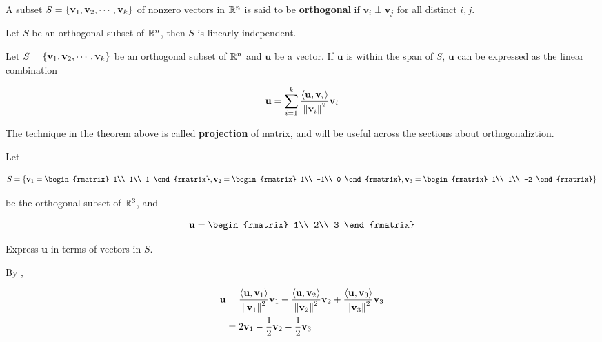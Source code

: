 \documentclass[a4paper,12pt]{article}
\begin{document}
\begin{dft}
  A subset $S=\left\{ \mathbf{v}_{1},\mathbf{v}_{2},\cdots,\mathbf{v}_{k}\right\}$ of nonzero vectors in $\mathbb{R}^{n}$ is said to be \textbf{orthogonal} if $\mathbf{v}_{i}\perp\mathbf{v}_{j}$ for all distinct $i,j$.
\end{dft}\n

\begin{thm}
  Let $S$ be an orthogonal subset of $\mathbb{R}^{n}$, then $S$ is linearly independent.
\end{thm}\n

\begin{thm}
  Let $S=\left\{ \mathbf{v}_{1},\mathbf{v}_{2},\cdots,\mathbf{v}_{k}\right\}$ be an orthogonal subset of $\mathbb{R}^{n}$ and $\mathbf{u}$ be a vector. If $\mathbf{u}$ is within the span of $S$, $\mathbf{u}$ can be expressed as the linear combination

  $$\mathbf{u}=\sum_{i=1}^{k}\frac{\left\langle \mathbf{u},\mathbf{v}_{i}\right\rangle}{\left\| \mathbf{v}_{i}\right\|^{2}}\mathbf{v}_{i}$$
\end{thm}\n

The technique in the theorem above is called \textbf{projection} of matrix, and will be useful across the sections about orthogonaliztion.\n

\begin{exm}
  Let

  $$S=\brc{\mathbf{v}_{1}=\begin{rmatrix}
    1\\
    1\\
    1
  \end{rmatrix},\mathbf{v}_{2}=\begin{rmatrix}
    1\\
    -1\\
    0
  \end{rmatrix},\mathbf{v}_{3}=\begin{rmatrix}
    1\\
    1\\
    -2
  \end{rmatrix}}$$\s

  be the orthogonal subset of $\mathbb{R}^{3}$, and

  $$\mathbf{u}=\begin{rmatrix}
    1\\
    2\\
    3
  \end{rmatrix}$$\s

  Express $\mathbf{u}$ in terms of vectors in $S$.\n

  \ans By \rthm[\sctr{1}],

  $$\begin{aligned}[t]
    \mathbf{u}&=\frac{\left\langle \mathbf{u},\mathbf{v}_{1}\right\rangle}{\left\| \mathbf{v}_{1}\right\|^{2}}\mathbf{v}_{1}+\frac{\left\langle \mathbf{u},\mathbf{v}_{2}\right\rangle}{\left\| \mathbf{v}_{2}\right\|^{2}}\mathbf{v}_{2}+\frac{\left\langle \mathbf{u},\mathbf{v}_{3}\right\rangle}{\left\| \mathbf{v}_{3}\right\|^{2}}\mathbf{v}_{3}\\
    &=2\mathbf{v}_{1}-\frac{1}{2}\mathbf{v}_{2}-\frac{1}{2}\mathbf{v}_{3}
  \end{aligned}$$
\end{exm}
\end{document}
